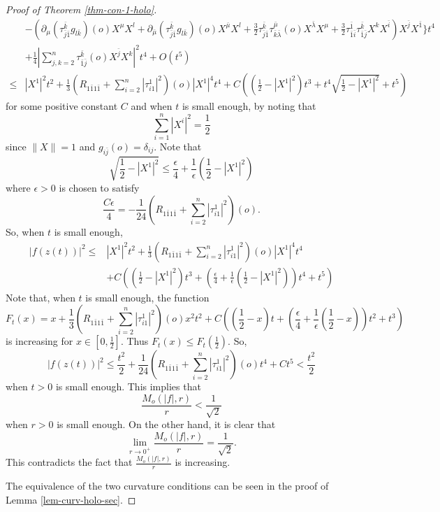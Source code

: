 \documentclass[12pt]{amsart}
\def\e{\epsilon}
\def\bk{{\bar k}}
\def\p{\partial}
\theoremstyle{definition}
\theoremstyle{remark}
\numberwithin{equation}{section}
\def\bi{{\bar i}}
\def\bj{{\bar j}}
\begin{document}
\begin{proof}[Proof of Theorem \ref{thm-con-1-holo}]
\begin{equation*}
\begin{split}
&-\left(\p_\mu(\tau_{\bar j\bar 1}^\bk g_{l\bk})(o)X^\mu X^l
+\p_{\bar \mu}(\tau_{\bar j\bar 1}^\bk g_{l\bk})(o)X^{\bar\mu}X^l+\frac32\tau_{\bar j\bar 1}^\bk\tau_{\bar k\bar\lambda}^{\bar \mu}(o)X^{\bar\lambda}X^\mu+\frac32\tau_{\bar 1\bar i}^{\bar 1}\tau_{\bar 1\bj}^\bk X^k X^\bi\right) X^{\bar j}X^{\bar 1}\bigg\}t^4\\
&+\frac14\left|\sum_{j,k=2}^n\tau_{\bar 1\bj}^\bk(o) X^\bj X^k\right|^2t^4+O(t^5)\\
\leq&|X^1|^2t^2+\frac13(R_{1\bar 11\bar 1}+\sum_{i=2}^n|\tau_{i 1}^{ 1}|^2)(o)|X^1|^4t^4+C\left(\left(\frac12-|X^1|^2\right)t^3+t^4\sqrt{\frac12-|X^1|^2}+t^5\right)
\end{split}
\end{equation*}
for some positive constant $C$ and when $t$ is small enough, by noting  that $$\sum_{i=1}^n|X^i|^2=\frac12$$
since $\|X\|=1$ and $g_{i\bar j}(o)=\delta_{ij}$. Note that
\begin{equation}
\sqrt{\frac12-|X^1|^2}\leq \frac{\e}{4}+\frac1\e\left(\frac12-|X^1|^2\right)
\end{equation}
where $\e>0$ is chosen to satisfy
\begin{equation}
\frac{C\e}{4}=-\frac{1}{24}(R_{1\bar 11\bar 1}+\sum_{i=2}^n|\tau_{i1}^{1}|^2)(o).
\end{equation}
So, when $t$ is small enough,
\begin{equation}
\begin{split}
|f(z(t))|^2\leq& |X^1|^2t^2+\frac13(R_{1\bar 11\bar 1}+\sum_{i=2}^n|\tau_{i1}^{1}|^2)(o)|X^1|^4t^4\\
&+C\left(\left(\frac12-|X^1|^2\right)t^3+\left(\frac\e4+\frac1\e\left(\frac12-|X^1|^2\right)\right)t^4+t^5\right)
\end{split}
\end{equation}
Note that, when $t$ is small enough, the function
\begin{equation}
F_t(x)=x+\frac13(R_{1\bar 11\bar 1}+\sum_{i=2}^n|\tau_{i1}^{1}|^2)(o)x^2t^2+C\left(\left(\frac12-x\right)t+\left(\frac{\e}{4}+\frac1\e\left(\frac12-x\right)\right)t^2+t^3\right)
\end{equation}
is increasing for $x\in [0,\frac12]$. Thus $F_t(x)\leq F_t(\frac12)$. So,
\begin{equation}
|f(z(t))|^2\leq \frac{t^2}{2}+\frac1{24}(R_{1\bar 11\bar 1}+\sum_{i=2}^n|\tau_{i 1}^{1}|^2)(o)t^4+Ct^5< \frac{t^2}{2}
\end{equation}
when $t>0$ is small enough. This implies that
\begin{equation}
\frac{M_o(|f|,r)}{r}<\frac1{\sqrt 2}
\end{equation}
when $r>0$ is small enough. On the other hand, it is clear that
\begin{equation}
\lim_{r\to 0^+}\frac{M_o(|f|,r)}{r}=\frac1{\sqrt 2}.
\end{equation}
This contradicts the fact that $\frac{M_o(|f|,r)}{r}$ is increasing.

The equivalence of the two curvature conditions can be seen in the proof of Lemma \ref{lem-curv-holo-sec}.
\end{proof}
\end{document}
